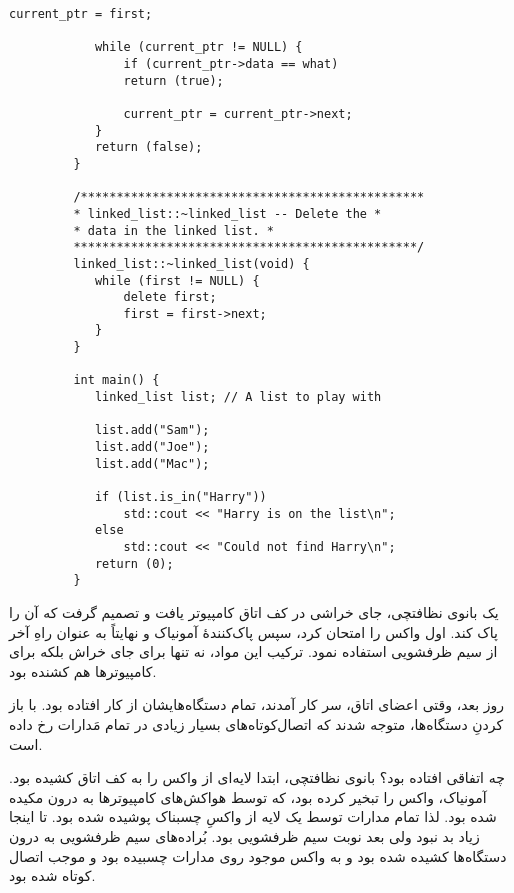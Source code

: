 \begin{LTR}
\begin{lstlisting}[style=C++Style]
         	current_ptr = first;

         	while (current_ptr != NULL) {
         		if (current_ptr->data == what)
         		return (true);

         		current_ptr = current_ptr->next;
         	}
         	return (false);
         }

         /************************************************
         * linked_list::~linked_list -- Delete the *
         * data in the linked list. *
         ************************************************/
         linked_list::~linked_list(void) {
         	while (first != NULL) {
         		delete first;
         		first = first->next;
         	}
         }

         int main() {
         	linked_list list; // A list to play with

         	list.add("Sam");
         	list.add("Joe");
         	list.add("Mac");

         	if (list.is_in("Harry"))
         		std::cout << "Harry is on the list\n";
         	else
         		std::cout << "Could not find Harry\n";
         	return (0);
         }
    \end{lstlisting}
\end{LTR}

\begin{tcolorbox}
    یک بانوی نظافتچی، جای خراشی در کف اتاق کامپیوتر یافت و تصمیم گرفت که آن را پاک کند. اول واکس را امتحان کرد، سپس پاک‌کنندهٔ آمونیاک و نهایتاً به عنوان راهِ آخر از سیم ظرفشویی استفاده نمود. ترکیب این مواد، نه تنها برای جای خراش بلکه برای کامپیوترها هم کشنده بود.

    روز بعد، وقتی اعضای اتاق، سر کار آمدند، تمام دستگاه‌هایشان از کار افتاده بود. با باز کردنِ دستگاه‌ها، متوجه شدند که اتصال‌کوتاه‌های بسیار زیادی در تمام مَدارات رخ داده است.

    چه اتفاقی افتاده بود؟ بانوی نظافتچی، ابتدا لایه‌ای از واکس را به کف اتاق کشیده بود. آمونیاک، واکس را تبخیر کرده بود، که توسط هواکش‌های کامپیوترها به درون مکیده شده بود. لذا تمام مدارات توسط یک لایه از واکسِ چسبناک پوشیده شده بود. تا اینجا زیاد بد نبود ولی بعد نوبت سیم ظرفشویی بود. بُراده‌های سیم ظرفشویی به درون دستگاه‌ها کشیده شده بود و به واکس موجود روی مدارات چسبیده بود و موجب اتصال کوتاه شده بود.
\end{tcolorbox}